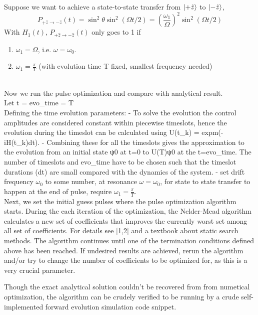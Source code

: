 \documentclass{article}
\begin{document}
Suppose we want to achieve a state-to-state transfer from $\ket{+\hat{z}}$ to $\ket{-\hat{z}}$,  
$$
P_{+\hat{z} \rightarrow-\hat{z}}(t) = \sin ^2 \theta \sin ^2(\Omega t / 2)=\left(\frac{\omega_1}{\Omega}\right)^2 \sin ^2(\Omega t / 2)
$$
With $H_1(t)$, $P_{+\hat{z} \rightarrow-\hat{z}}(t)$ only goes to 1 if 
\begin{enumerate}
    \item $\omega_1 = \Omega$, i.e. $\omega = \omega_0$.
    \item $\omega_1 = \frac{\pi}{T}$ (with evolution time T fixed, smallest frequency needed)
\end{enumerate}

\\

Now we run the pulse optimization and compare with analytical result. 
\\
Let t = evo_time = T
\\
Defining the time evolution parameters:
- To solve the evolution the control amplitudes are considered constant within piecewise timeslots, hence the evolution during the timeslot can be calculated using U(t_k) = expm(-iH(t_k)dt). 
- Combining these for all the timeslots gives the approximation to the evolution from an initial state ψ0 at t=0 to U(T)ψ0 at the t=evo_time. The number of timeslots and evo_time have to be chosen such that the timeslot durations (dt) are small compared with the dynamics of the system.
- set drift frequency $\omega_0$ to some number, at resonance $\omega = \omega_0$, for state to state transfer to happen at the end of pulse, require $\omega_1 = \frac{\pi}{T}$.
\\
Next, we set the initial guess pulses where the pulse optimization algorithm starts. 
During the each iteration of the optimization, the Nelder-Mead algorithm calculates a new set of coefficients that improves the currently worst set among all set of coefficients. For details see [1,2] and a textbook about static search methods. 
The algorithm continues until one of the termination conditions defined above has been reached. If undesired results are achieved, rerun the algorithm and/or try to change the number of coefficients to be optimized for, as this is a very crucial parameter.  


Though the exact analytical solution couldn't be recovered from from numetical optimization, 
the algorithm can be crudely verified to be running by a crude self-implemented forward 
evolution simulation code snippet. 
\end{document}
